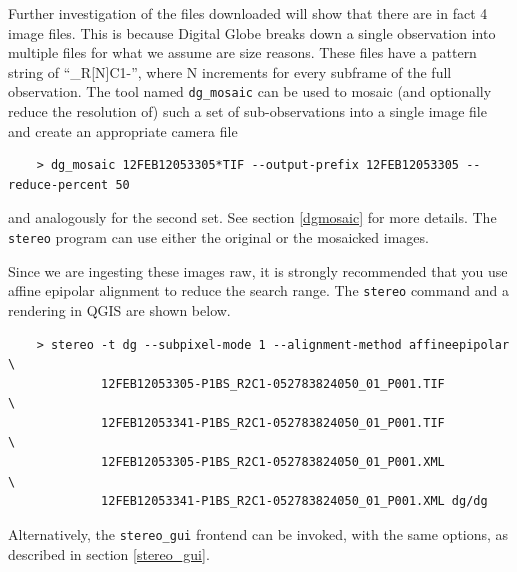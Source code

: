 Further investigation of the files downloaded will show that there are
in fact 4 image files. This is because Digital Globe breaks down a
single observation into multiple files for what we assume are size
reasons. These files have a pattern string of ``\_R[N]C1-'', where N
increments for every subframe of the full observation. The tool named
\texttt{dg\_mosaic} can be used to mosaic (and optionally reduce the
resolution of) such a set of sub-observations into a single image file
and create an appropriate camera file

\begin{verbatim}
    > dg_mosaic 12FEB12053305*TIF --output-prefix 12FEB12053305 --reduce-percent 50
\end{verbatim}

and analogously for the second set. See section \ref{dgmosaic} for more
details. The \texttt{stereo} program can use either the original or the mosaicked images.

Since we are ingesting these images raw, it is strongly recommended that
you use affine epipolar alignment to reduce the search range. The
\texttt{stereo} command and a rendering in QGIS are shown below.

\begin{verbatim}
    > stereo -t dg --subpixel-mode 1 --alignment-method affineepipolar \
             12FEB12053305-P1BS_R2C1-052783824050_01_P001.TIF          \
             12FEB12053341-P1BS_R2C1-052783824050_01_P001.TIF          \
             12FEB12053305-P1BS_R2C1-052783824050_01_P001.XML          \
             12FEB12053341-P1BS_R2C1-052783824050_01_P001.XML dg/dg
\end{verbatim}

Alternatively, the \texttt{stereo\_gui} frontend can be invoked, with
the same options, as described in section \ref{stereo_gui}.

